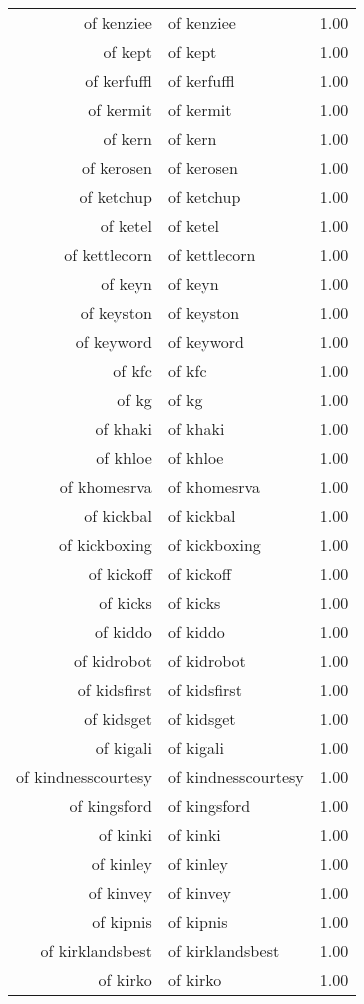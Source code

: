 \begin{table}[ht]
\begin{tabular}{rlr}
  of kenziee & of kenziee & 1.00 \\ 
  of kept & of kept & 1.00 \\ 
  of kerfuffl & of kerfuffl & 1.00 \\ 
  of kermit & of kermit & 1.00 \\ 
  of kern & of kern & 1.00 \\ 
  of kerosen & of kerosen & 1.00 \\ 
  of ketchup & of ketchup & 1.00 \\ 
  of ketel & of ketel & 1.00 \\ 
  of kettlecorn & of kettlecorn & 1.00 \\ 
  of keyn & of keyn & 1.00 \\ 
  of keyston & of keyston & 1.00 \\ 
  of keyword & of keyword & 1.00 \\ 
  of kfc & of kfc & 1.00 \\ 
  of kg & of kg & 1.00 \\ 
  of khaki & of khaki & 1.00 \\ 
  of khloe & of khloe & 1.00 \\ 
  of khomesrva & of khomesrva & 1.00 \\ 
  of kickbal & of kickbal & 1.00 \\ 
  of kickboxing & of kickboxing & 1.00 \\ 
  of kickoff & of kickoff & 1.00 \\ 
  of kicks & of kicks & 1.00 \\ 
  of kiddo & of kiddo & 1.00 \\ 
  of kidrobot & of kidrobot & 1.00 \\ 
  of kidsfirst & of kidsfirst & 1.00 \\ 
  of kidsget & of kidsget & 1.00 \\ 
  of kigali & of kigali & 1.00 \\ 
  of kindnesscourtesy & of kindnesscourtesy & 1.00 \\ 
  of kingsford & of kingsford & 1.00 \\ 
  of kinki & of kinki & 1.00 \\ 
  of kinley & of kinley & 1.00 \\ 
  of kinvey & of kinvey & 1.00 \\ 
  of kipnis & of kipnis & 1.00 \\ 
  of kirklandsbest & of kirklandsbest & 1.00 \\ 
  of kirko & of kirko & 1.00 \\ 

\end{tabular}
\end{table}

